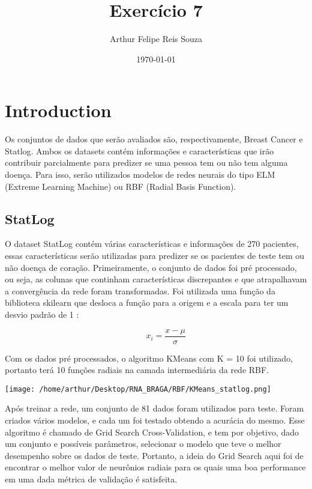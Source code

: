 \documentclass{article}
\begin{document}
\title{Exercício 7} 
\author{Arthur Felipe Reis Souza}
\date{\today}
\maketitle

\section{Introduction}

Os conjuntos de dados que serão avaliados são, respectivamente, Breast Cancer e Statlog. Ambos os datasets contém informações e características que irão contribuir parcialmente para predizer se uma pessoa tem ou não tem alguma doença. Para isso, serão utilizados modelos de redes neurais do tipo ELM (Extreme Learning Machine) ou RBF (Radial Basis Function).

\subsection{StatLog}

O dataset StatLog contém várias características e informações de 270 pacientes, essas características serão utilizadas para predizer se os pacientes de teste tem ou não doença de coração. Primeiramente, o conjunto de dados foi pré processado, ou seja, as colunas que continham características discrepantes e que atrapalhavam a convergência da rede foram transformadas. Foi utilizada uma função da biblioteca skilearn que desloca a função para a origem e a escala para  ter um desvio padrão de 1 : 

\[ \hspace{1cm} x_i = \frac{x - \mu}{\sigma} \]


\vspace{10pt}

Com os dados pré processados, o algoritmo KMeans com K = 10 foi utilizado, portanto terá 10 funções radiais na camada intermediária da rede RBF.

\vspace{10pt}

\begin{center}

\texttt{[image: /home/arthur/Desktop/RNA\_BRAGA/RBF/KMeans\_statlog.png]}
    
\end{center}

\vspace{10pt}

Após treinar a rede, um conjunto de 81 dados foram utilizados para teste. Foram criados vários modelos, e cada um foi testado obtendo a acurácia do mesmo. Esse algoritmo é chamado de Grid Search Cross-Validation, e tem por objetivo, dado um conjunto e possíveis parâmetros, selecionar o modelo que teve o melhor desempenho sobre os dados de teste. Portanto, a ideia do Grid Search aqui foi de encontrar o melhor valor de neurônios radiais para os quais uma boa performance em uma dada métrica de validação é satisfeita.
\end{document}
